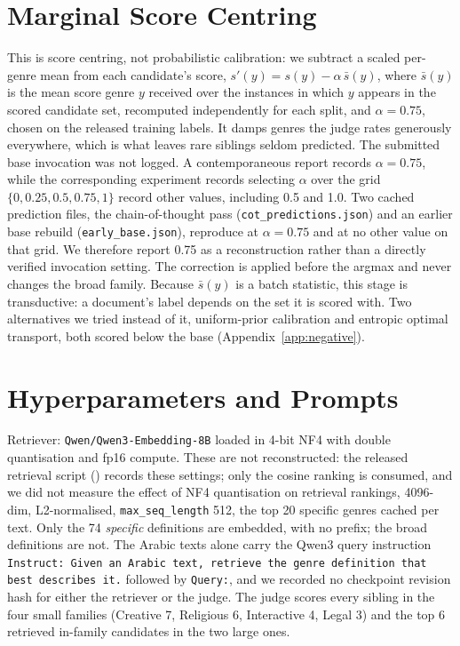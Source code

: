 \documentclass[11pt]{article}
\begin{document}
\section{Marginal Score Centring}
\label{app:calib}
This is score centring, not probabilistic calibration: we subtract a scaled per-genre mean from
each candidate's score,
$s'(y) = s(y) - \alpha\,\bar{s}(y)$, where $\bar{s}(y)$ is the mean score genre $y$ received
over the instances in which $y$ appears in the scored candidate set, recomputed independently for
each split, and $\alpha{=}0.75$, chosen on the released training labels. It
damps genres the judge rates generously everywhere, which is what leaves rare siblings seldom
predicted. The submitted base invocation was not logged. A contemporaneous report records
$\alpha{=}0.75$, while the corresponding experiment records selecting $\alpha$ over the grid
$\{0, 0.25, 0.5, 0.75, 1\}$ record other values, including 0.5 and 1.0. Two cached prediction
files, the chain-of-thought pass (\texttt{cot\_predictions.json}) and an earlier base rebuild
(\texttt{early\_base.json}), reproduce at $\alpha{=}0.75$ and at no other value on that grid. We
therefore report 0.75 as a reconstruction rather than a directly verified invocation setting.
The correction is applied before the argmax and never changes the broad family. Because
$\bar{s}(y)$ is a batch statistic, this stage is transductive: a document's label depends on the
set it is scored with. Two
alternatives we tried instead of it, uniform-prior calibration and entropic optimal transport,
both scored below the base (Appendix~\ref{app:negative}).

\section{Hyperparameters and Prompts}
\label{app:hparams}
Retriever: \texttt{Qwen/\allowbreak Qwen3-\allowbreak Embedding-\allowbreak 8B} loaded in 4-bit
NF4 with double quantisation and fp16 compute. These are not reconstructed: the released
retrieval script () records these settings; only the cosine
ranking is consumed, and we did not measure the effect of
NF4 quantisation on retrieval rankings, 4096-dim, L2-normalised, \texttt{max\_seq\_length} 512, the
top 20 specific genres cached per text. Only the 74 \emph{specific} definitions are embedded, with
no prefix; the broad definitions are not. The Arabic texts alone carry the Qwen3 query
instruction \texttt{Instruct: Given an Arabic text, retrieve the genre definition that best
describes it.} followed by \texttt{Query:}, and we recorded no checkpoint revision hash for either the retriever or the judge.
The judge scores every sibling in the four small families (Creative 7,
Religious 6, Interactive 4, Legal 3) and the top 6 retrieved in-family candidates in the two
large ones.
\end{document}
